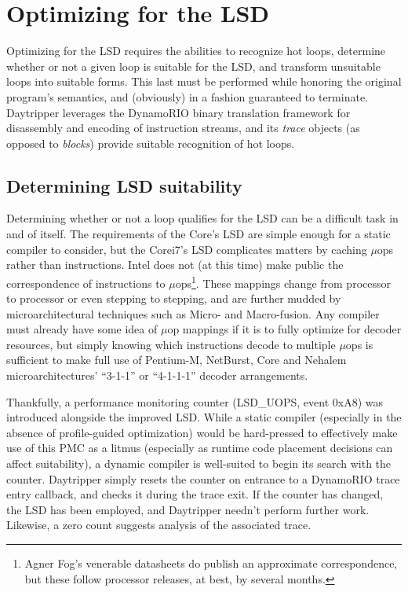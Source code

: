 \documentclass[]{sigplanconf}
\begin{document}
\section{Optimizing for the LSD}
Optimizing for the LSD requires the abilities to recognize hot loops, determine
whether or not a given loop is suitable for the LSD, and transform unsuitable
loops into suitable forms. This last must be performed while honoring the
original program's semantics, and (obviously) in a fashion guaranteed to
terminate. Daytripper leverages the DynamoRIO binary translation framework
for disassembly and encoding of instruction streams, and its \textit{trace}
objects (as opposed to \textit{blocks}) provide suitable recognition of hot
loops.

\subsection{Determining LSD suitability}
Determining whether or not a loop qualifies for the LSD can be a difficult task
in and of itself. The requirements of the Core's LSD are simple
enough for a static compiler to consider, but the Core\texttrademark i7's LSD
complicates matters by caching $\mu$ops rather than instructions. Intel does
not (at this time) make public the correspondence of instructions to $\mu$ops\footnote{Agner Fog's venerable datasheets \cite{agnerfog} do publish an approximate correspondence, but these follow processor releases, at best, by several months.}. These 
mappings change from processor to processor or even stepping to stepping, and
are further mudded by microarchitectural techniques such as Micro- and Macro-fusion. Any
compiler must already have some idea of $\mu$op mappings
if it is to fully optimize for decoder resources, but simply knowing which
instructions decode to multiple $\mu$ops is sufficient to make full use of
Pentium-M, NetBurst, Core and Nehalem microarchitectures' ``3-1-1'' or ``4-1-1-1''
decoder arrangements.

Thankfully, a performance monitoring counter (LSD\_UOPS, event 0xA8) was
introduced alongside the improved LSD. While a static compiler (especially in
the absence of profile-guided optimization) would be hard-pressed to
effectively make use of this PMC as a litmus (especially as runtime code
placement decisions can affect suitability), a dynamic compiler is well-suited
to begin its search with the counter. Daytripper simply resets the counter on
entrance to a DynamoRIO trace entry callback, and checks it during the trace
exit. If the counter has changed, the LSD has been employed, and Daytripper
needn't perform further work. Likewise, a zero count suggests analysis of the
associated trace.
\end{document}
